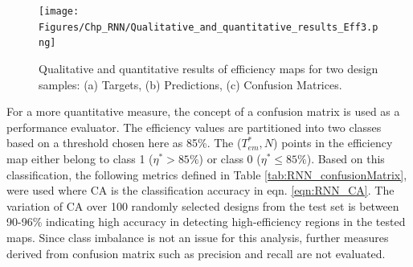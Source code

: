 \begin{figure}
    \centering
    \texttt{[image: Figures/Chp\_RNN/Qualitative\_and\_quantitative\_results\_Eff3.png]}
    \caption{Qualitative and quantitative results of efficiency maps for two design samples: (a) Targets, (b) Predictions, (c) Confusion Matrices.}
    \label{fig:RNN_Fig-6_resultsRNN}
\end{figure}

For a more quantitative measure, the concept of a confusion matrix \parencite{geron2019hands} is used as a performance evaluator. The efficiency values are partitioned into two classes based on a threshold chosen here as 85\%. The ($T_{em}^*,N$) points in the efficiency map either belong to class 1 ($\eta^*>85\%$) or class 0 ($\eta^*\leq85\%$). Based on this classification, the following metrics defined in Table \ref{tab:RNN_confusionMatrix}, were used where CA is the classification accuracy in eqn. \ref{eqn:RNN_CA}. The variation of CA over 100 randomly selected designs from the test set is between 90-96\% indicating high accuracy in detecting high-efficiency regions in the tested maps. Since class imbalance is not an issue for this analysis, further measures derived from confusion matrix such as precision and recall are not evaluated.

\begin{table}[h!]
\centering
{}
\caption{Confusion Matrix for high efficiency classification.}
\label{tab:RNN_confusionMatrix}
\end{table}

